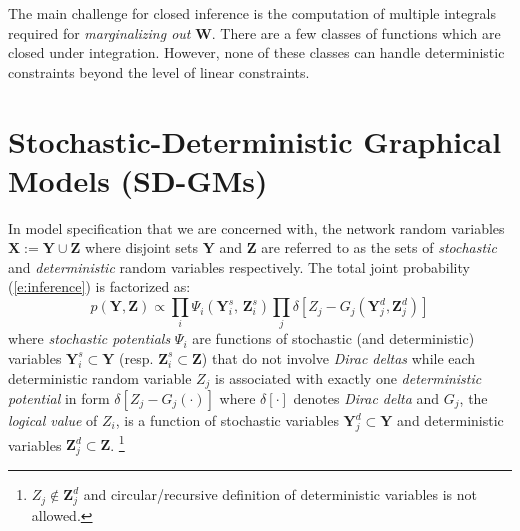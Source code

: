 \documentclass{article}
\newcommand{\bvec}[1]{\textbf{#1}}
\newcommand{\pr}{p}
\begin{document}
The main challenge for closed inference is the computation of multiple integrals required for \emph{marginalizing {\color{green}out}} $\bvec{W}$.
There are a few classes of functions which are closed under integration.
However, none of these classes can handle deterministic constraints beyond the level of linear constraints.

\section{Stochastic-Deterministic Graphical Models (SD-GMs)}
\label{sect:contribution1}
In model specification that we are concerned with,
the network random variables $\bvec{X} := \bvec{Y} \cup \bvec{Z}$
where disjoint sets $\bvec{Y}$ and $\bvec{Z}$ are referred to as the sets of \emph{stochastic} and \emph{deterministic}  random variables respectively. 
The total joint probability (\ref{e:inference}) is factorized as:
\begin{equation}
\label{e:infer.sd}
\pr(\bvec{Y}, \bvec{Z}) \propto 
\prod_{i} \Psi_i (\bvec{Y}^s_i, \, \bvec{Z}^s_i)
\prod_j \delta[
Z_j - G_j(\bvec{Y}^d_j, \bvec{Z}^d_j)
]
\end{equation}
where \emph{stochastic potentials} $\Psi_i$ are functions 
of stochastic (and deterministic) variables 
$\bvec{Y}^s_i \subset \bvec{Y}$ 
(resp. $\bvec{Z}^s_i \subset \bvec{Z}$) that do not involve 
\emph{Dirac deltas} while 
each deterministic random variable $Z_j$ 
is associated with exactly one 
\emph{deterministic potential} in form 
$\delta[Z_j - G_j(\cdot)]$ 
 where $\delta[\cdot]$ denotes \emph{Dirac delta} and $G_j$, the \emph{logical value} of $Z_i$,  is a function of 
stochastic variables $\bvec{Y}_j^d \subset \bvec{Y}$ and deterministic variables $\bvec{Z}_j^d \subset \bvec{Z}$. 
\footnote{
$Z_j \not \in \bvec{Z}_j^d$ 
and circular/recursive definition of deterministic variables is not allowed. }
\end{document}
